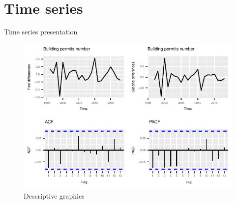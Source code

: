 \documentclass[11pt,ignorenonframetext,]{beamer}
\begin{document}
\hypertarget{time-series}{%
\section{Time series}\label{time-series}}

\begin{frame}{Time series presentation}
\protect\hypertarget{time-series-presentation}{}

\FloatBarrier

\tiny

\begin{figure}[!htbp]

{\centering \includegraphics{presentation_files/figure-beamer/unnamed-chunk-33-1} 

}

\caption{Descriptive graphics}\label{fig:unnamed-chunk-33}
\end{figure}

\normalsize

\FloatBarrier

\end{frame}
\end{document}
